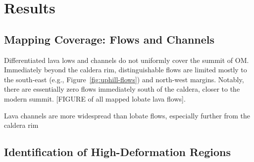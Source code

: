 \chapter{Results}
\section{Mapping Coverage: Flows and Channels}
Differentiated lava lows and channels do not uniformly cover the summit of \acf{OM}. Immediately beyond the caldera rim, distinguishable flows are limited mostly to the south-east (e.g., Figure~\ref{fig:uphill-flows}) and north-west margins. Notably, there are essentially zero flows immediately south of the caldera, closer to the modern summit. [FIGURE of all mapped lobate lava flows]. 

Lava channels are more widespread than lobate flows, especially further from the caldera rim 


\section{Identification of High-Deformation Regions}